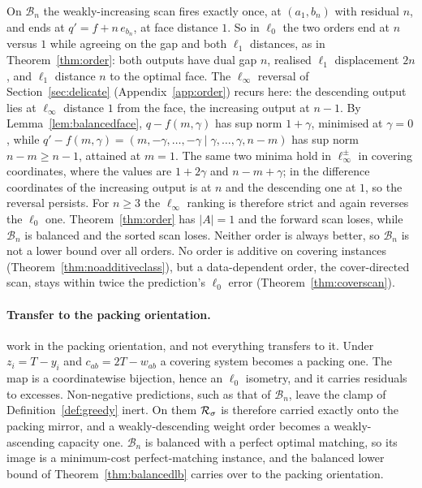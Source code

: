 \begin{remark}\label{rem:balancedorder}
On $\mathcal{B}_n$ the weakly-increasing scan fires exactly once, at $(a_1,b_n)$ with residual
$n$, and ends at $q' = f + n\,e_{b_n}$, at face distance $1$. So in $\ell_0$ the two orders end at
$n$ versus $1$ while agreeing on the gap and both $\ell_1$ distances, as in Theorem~\ref{thm:order}: both
outputs have dual gap $n$, realised $\ell_1$ displacement $2n$, and $\ell_1$ distance $n$ to the
optimal face. The $\ell_\infty$ reversal of Section~\ref{sec:delicate} (Appendix~\ref{app:order})
recurs here: the descending output lies at $\ell_\infty$ distance $1$ from the face, the increasing
output at $n-1$. By Lemma~\ref{lem:balancedface}, $q - f(m,\gamma)$ has sup norm $1 + \gamma$,
minimised at $\gamma = 0$, while
$q' - f(m,\gamma) = (m, -\gamma, \dots, -\gamma \mid \gamma, \dots, \gamma, n-m)$ has sup norm
$n - m \ge n - 1$, attained at $m = 1$. The same two minima hold in $\ell_\infty^\pm$ in covering
coordinates, where the values are $1 + 2\gamma$ and $n - m + \gamma$; in the difference coordinates
of \citet{sakaue2022} the increasing output is at $n$ and the descending one at $1$, so the reversal
persists. For $n \ge 3$ the $\ell_\infty$ ranking is therefore strict and again reverses the
$\ell_0$ one. Theorem~\ref{thm:order} has $|A| = 1$ and the forward scan loses, while $\mathcal{B}_n$ is balanced
and the sorted scan loses. Neither order is always better, so $\mathcal{B}_n$ is not a lower bound
over all orders. No order is additive on covering instances (Theorem~\ref{thm:noadditiveclass}), but
a data-dependent order, the cover-directed scan, stays within twice the prediction's $\ell_0$ error
(Theorem~\ref{thm:coverscan}).
\end{remark}

\paragraph{Transfer to the packing orientation.} \citet[Thm.~3.2]{chen2022} work in the packing
orientation, and not everything transfers to it. Under $z_i = T - y_i$ and $c_{ab} = 2T - w_{ab}$ a
covering system becomes a packing one. The map is a coordinatewise bijection, hence an $\ell_0$
isometry, and it carries residuals to excesses. Non-negative predictions, such as that of
$\mathcal{B}_n$, leave the clamp of Definition~\ref{def:greedy} inert. On them $\mathcal{R}_\sigma$ is
therefore carried exactly onto the packing mirror, and a weakly-descending weight order becomes a
weakly-ascending capacity one. $\mathcal{B}_n$ is balanced with a perfect optimal matching, so its
image is a minimum-cost perfect-matching instance, and the balanced lower bound of
Theorem~\ref{thm:balancedlb} carries over to the packing orientation.

